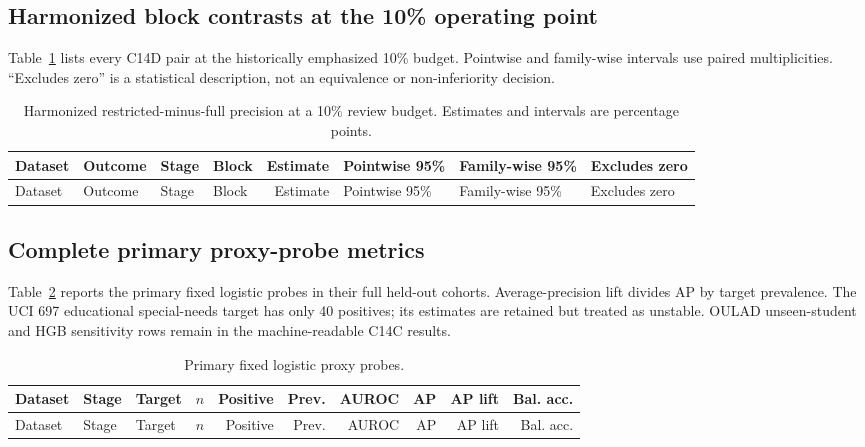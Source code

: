 \subsection{Harmonized block contrasts at the 10\% operating point}

Table~\ref{tab:s_c14harm10} lists every C14D pair at the historically emphasized 10\% budget. Pointwise and family-wise intervals use paired multiplicities. ``Excludes zero'' is a statistical description, not an equivalence or non-inferiority decision.

\tiny
\setlength{\tabcolsep}{1.5pt}
\begin{longtable}{p{}p{}p{}p{}rp{}p{}l}
\caption{Harmonized restricted-minus-full precision at a 10\% review budget. Estimates and intervals are percentage points.}\label{tab:s_c14harm10}\\
\toprule
Dataset & Outcome & Stage & Block & Estimate & Pointwise 95\% & Family-wise 95\% & Excludes zero \\
\midrule
\endfirsthead
\toprule
Dataset & Outcome & Stage & Block & Estimate & Pointwise 95\% & Family-wise 95\% & Excludes zero \\
\midrule
\endhead

\end{longtable}
\setlength{\tabcolsep}{6pt}
\normalsize

\subsection{Complete primary proxy-probe metrics}

Table~\ref{tab:s_c14proxy} reports the primary fixed logistic probes in their full held-out cohorts. Average-precision lift divides AP by target prevalence. The UCI 697 educational special-needs target has only 40 positives; its estimates are retained but treated as unstable. OULAD unseen-student and HGB sensitivity rows remain in the machine-readable C14C results.

\tiny
\setlength{\tabcolsep}{1.3pt}
\begin{longtable}{p{}p{}p{}rrrrrrr}
\caption{Primary fixed logistic proxy probes.}\label{tab:s_c14proxy}\\
\toprule
Dataset & Stage & Target & $n$ & Positive & Prev. & AUROC & AP & AP lift & Bal. acc. \\
\midrule
\endfirsthead
\toprule
Dataset & Stage & Target & $n$ & Positive & Prev. & AUROC & AP & AP lift & Bal. acc. \\
\midrule
\endhead

\end{longtable}
\setlength{\tabcolsep}{6pt}
\normalsize

